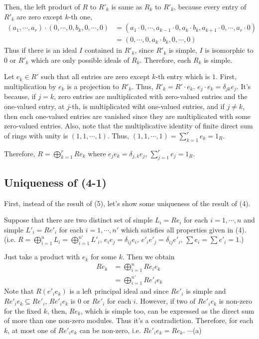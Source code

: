 Then, the left product of \(R\) to \(R'_k\)
is same as \(R_k\) to \(R'_k\),
because every entry of \(R'_k\) are zero except \(k\)-th one,
\begin{align*}
  (a_1, \cdots, a_r) \cdot (0, \cdots, 0, b_k, 0, \cdots, 0)
  &= (a_1 \cdot 0, \cdots, a_{k-1} \cdot 0, a_k \cdot b_k, a_{k+1} \cdot 0, \cdots, a_r \cdot 0)
  \\&= (0, \cdots, 0, a_k \cdot b_k, 0, \cdots, 0)
\end{align*}
Thus if there is an ideal \(I\) contained in \(R'_k\),
since \(R'_k\) is simple,
\(I\) is isomorphic to \(0\) or \(R'_k\) which are only possible ideals of \(R_k\).
Therefore, each \(R_k\) is simple.

Let \(e_k \in R'\) such that all entries are zero except \(k\)-th entry which is \(1\).
First, multiplication by \(e_k\) is a projection to \(R'_k\).
Thus, \(R'_k = R' \cdot e_k\).
\(e_j \cdot e_k = \delta_{jk} e_j\).
It's because, if \(j = k\), zero entries are multiplicated with zero-valued entries
and the one-valued entry, at \(j\)-th, is multiplicated wiht one-valued entries,
and if \(j \neq k\), then each one-valued entries are vanished
since they are multiplicated with some zero-valued entries.
Also, note that the multiplicative identity of
finite direct sum of rings with unity
is \((1, 1, \cdots, 1)\).
Thus, \((1, 1, \cdots, 1) = \sum_{k=1}^r e_k = 1_R\).

Therefore, \(R = \bigoplus_{k=1}^r R e_k\)
where \(e_j e_k = \delta_{j, k} e_j\),
\(\sum_{j=1}^r e_j = 1_R\).

\qedsq

\subsection*{Uniqueness of (4-1)}

First, instead of the result of (5),
let's show some uniqueness of the result of (4).

Suppose that there are two distinct set of 
simple \(L_i = Re_i\) for each \(i = 1, \cdots, n\)
and
simple \(L'_i = Re'_i\) for each \(i = 1, \cdots, n'\)
which satisfies all properties given in (4).
(i.e.
\(R = \bigoplus_{i=1}^n L_i = \bigoplus_{i=1}^{n'} L'_i\),
\(e_ie_j = \delta_{ij}e_i\),
\(e'_ie'_j = \delta_{ij}e'_i\),
\(\sum e_i = \sum e'_i = 1\).)

Just take a product with \(e_k\) for some \(k\).
Then we obtain
\begin{align*}
  R e_k &= \bigoplus_{i=1}^n Re_i e_k
  \\&= \bigoplus_{i=1}^{n'} R e'_i e_k
\end{align*}
Note that \(R(e'_ie_k)\) is a left principal ideal
and since \(Re'_i\) is simple and \(Re'_ie_k \subseteq Re'_i\),
\(Re'_ie_k\) is \(0\) or \(Re'_i\) for each \(i\).
However, if two of \(Re'_ie_k\) is non-zero for the fixed \(k\),
then, \(Re_k\), which is simple too, can be expressed as the
direct sum of more than one non-zero modules.
Thus it's a contradiction.
Therefore, for each \(k\), at most one of \(Re'_ie_k\)
can be non-zero, i.e. \(Re'_ie_k = Re_k\). \(\cdots\)(a)


